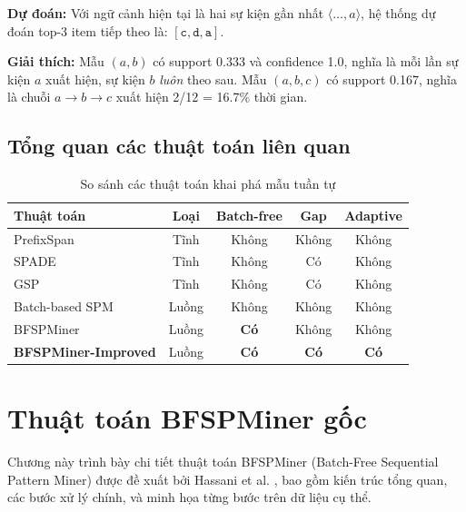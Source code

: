 \documentclass[a4paper,12pt]{report}
\begin{document}
\textbf{Dự đoán:} Với ngữ cảnh hiện tại là hai sự kiện gần nhất $\langle \dots, a \rangle$, hệ thống dự đoán top-3 item tiếp theo là: $[\texttt{c}, \texttt{d}, \texttt{a}]$.

\textbf{Giải thích:} Mẫu $(a, b)$ có support 0.333 và confidence 1.0, nghĩa là mỗi lần sự kiện $a$ xuất hiện, sự kiện $b$ \textit{luôn} theo sau. Mẫu $(a, b, c)$ có support 0.167, nghĩa là chuỗi $a \rightarrow b \rightarrow c$ xuất hiện 2/12 = 16.7\% thời gian.

\section{Tổng quan các thuật toán liên quan}

\begin{table}[H]
    \centering
    \caption{So sánh các thuật toán khai phá mẫu tuần tự}
    \label{tab:related}
    \begin{tabular}{lcccc}
        \toprule
        \textbf{Thuật toán} & \textbf{Loại} & \textbf{Batch-free} & \textbf{Gap} & \textbf{Adaptive} \\
        \midrule
        PrefixSpan \cite{pei2001}  & Tĩnh    & Không & Không & Không \\
        SPADE \cite{zaki2001}      & Tĩnh    & Không & Có    & Không \\
        GSP \cite{srikant1996}     & Tĩnh    & Không & Có    & Không \\
        Batch-based SPM            & Luồng   & Không & Không & Không \\
        BFSPMiner \cite{hassani2019} & Luồng & \textbf{Có} & Không & Không \\
        \textbf{BFSPMiner-Improved} & Luồng & \textbf{Có} & \textbf{Có} & \textbf{Có} \\
        \bottomrule
    \end{tabular}
\end{table}

\chapter{Thuật toán BFSPMiner gốc}
\label{chap:algorithm}

Chương này trình bày chi tiết thuật toán BFSPMiner (Batch-Free Sequential Pattern Miner) được đề xuất bởi Hassani et al. \cite{hassani2019}, bao gồm kiến trúc tổng quan, các bước xử lý chính, và minh họa từng bước trên dữ liệu cụ thể.
\end{document}

